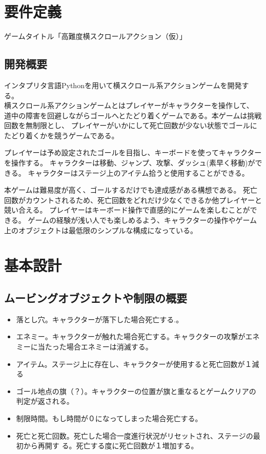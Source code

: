 \documentclass[11pt,a4paper]{jsarticle}
\begin{document}
\section{要件定義}
\noindent
ゲームタイトル「高難度横スクロールアクション（仮）」

\subsection{開発概要}
インタプリタ言語Pythonを用いて横スクロール系アクションゲームを開発する。\\
横スクロール系アクションゲームとはプレイヤーがキャラクターを操作して、
道中の障害を回避しながらゴールへとたどり着くゲームである。本ゲームは挑戦回数を無制限とし、
プレイヤーがいかにして死亡回数が少ない状態でゴールにたどり着くかを競うゲームである。

プレイヤーは予め設定されたゴールを目指し、キーボードを使ってキャラクターを操作する。
キャラクターは移動、ジャンプ、攻撃、ダッシュ(素早く移動)ができる。
キャラクターはステージ上のアイテム拾うと使用することができる。

本ゲームは難易度が高く、ゴールするだけでも達成感がある構想である。
死亡回数がカウントされるため、死亡回数をどれだけ少なくできるか他プレイヤーと競い合える。
プレイヤーはキーボード操作で直感的にゲームを楽しむことができる。
ゲームの経験が浅い人でも楽しめるよう、キャラクターの操作やゲーム上のオブジェクトは最低限のシンプルな構成になっている。

\section{基本設計}
\subsection{ムービングオブジェクトや制限の概要}
\begin{itemize}
\item 落とし穴。キャラクターが落下した場合死亡する.。
\item エネミー。キャラクターが触れた場合死亡する。キャラクターの攻撃がエネミーに当たった場合エネミーは消滅する。
\item アイテム。ステージ上に存在し、キャラクターが使用すると死亡回数が１減る
\item ゴール地点の旗（？）。キャラクターの位置が旗と重なるとゲームクリアの判定が返される。
\item 制限時間。もし時間が０になってしまった場合死亡する。
\item 死亡と死亡回数。死亡した場合一度進行状況がリセットされ、ステージの最初から再開す
る。死亡する度に死亡回数が１増加する。
\end{itemize}
\end{document}
